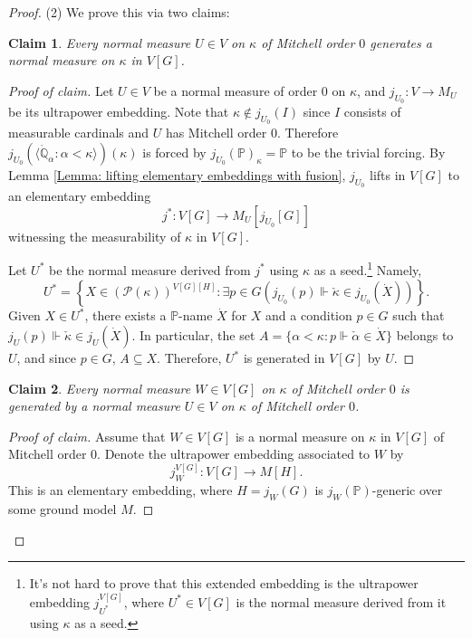 \documentclass[11pt]{amsart}
\newtheorem{claim}{Claim}[theorem]
\theoremstyle{definition}
\newcounter{condition}
\theoremstyle{remark}
\newcommand\<{{<}}
\newcommand{\po}{\mathbb{P}}
\newcommand{\qo}{\mathbb{Q}}
\newcommand{\la}{\langle}
\newcommand{\ra}{\rangle}
\begin{document}
\begin{proof}
    \smallskip

   (2)  We prove this via two claims:
   \begin{claim}\label{Claim: indestructibility proof, claim 1}
     Every normal measure $U\in V$ on $\kappa$ of Mitchell order $0$ generates a normal measure on $\kappa$ in $V[G]$.  
   \end{claim}
   \begin{proof}[Proof of claim]
      Let $U\in V$ be a normal measure of order $0$ on $\kappa$, and $j_{U_0}\colon V\to M_U$ be its ultrapower embedding. Note that $\kappa\notin j_{U_0}(I)$ since $I$ consists of measurable cardinals and $U$ has Mitchell order $0$. Therefore $j_{U_0}(\la \dot{\qo}_\alpha \colon \alpha<\kappa \ra)(\kappa)$ is forced by $j_{U_0}(\po)_ \kappa = \po$ to be the trivial forcing.
      By Lemma \ref{Lemma: lifting elementary embeddings with fusion}, $j_{U_0}$ lifts in $V[G]$ to an elementary embedding 
    $$j^*\colon V[G]\to M_{U}[j_{U_0}[G]]$$ witnessing the measurability of $\kappa$ in $V[G]$. 
    
    Let $U^*$ be the normal measure derived from $j^*$
using $\kappa$ as a seed.\footnote{It's not hard to prove that this extended embedding is the ultrapower embedding $j^{V[G]}_{U^*}$, where $U^*\in V[G]$ is the normal measure derived from it using $\kappa$ as a seed.} Namely,
 $$ U^* = \left\{ X\in (\mathcal{P}(\kappa))^{V[G][H]} \colon  \exists p\in G \left( j_{U_0}(p)\Vdash \check{\kappa}\in j_{U_0}(\dot{X}) \right)  \right\}.$$
 Given $X\in U^*$, there exists a $\po$-name $\dot{X}$ for $X$ and a condition $p\in G$ such that $j_{U}(p)\Vdash \check{\kappa}\in j_{U}(\dot{X})$. In particular, the set $A = \{ \alpha<\kappa \colon p\Vdash \check{\alpha}\in \dot{X} \}$ belongs to $U$, and since $p\in G$, $A\subseteq X$. Therefore, $U^*$ is generated in $V[G]$ by $U$. 
   \end{proof}

\begin{claim}\label{claim: Mitchell order 0 generated by measures of order 0}
    Every normal measure $W\in V[G]$ on $\kappa$ of Mitchell order $0$ is generated by a normal measure $U\in V$ on $\kappa$ of Mitchell order $0$.
\end{claim}
\begin{proof}[Proof of claim]
    Assume that $W\in V[G]$ is a normal measure on $\kappa$ in $V[G]$ of Mitchell order $0$. Denote the ultrapower embedding associated to $W$ by $$j^{V[G]}_W\colon V[G]\to M[H].$$ This is  an elementary embedding, where $H = j_W(G)$ is $j_W(\po)$-generic over some ground model $M$. 
    

\end{proof}
\end{proof}
\end{document}
